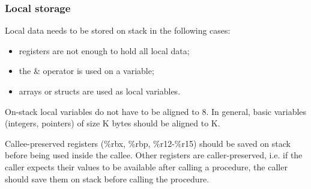 \subsubsection{Local storage}
Local data needs to be stored on stack in the following cases: 
\begin{itemize}
\item registers are not enough to hold all local data;
\item the \& operator is used on a variable;
\item arrays or structs are used as local variables.
\end{itemize}
On-stack local variables do not have to be aligned to 8. In general, basic variables (integers, pointers) of size K bytes should be aligned to K.

Callee-preserved registers (\%rbx, \%rbp, \%r12-\%r15) should be saved on stack before being used inside the callee. Other registers are caller-preserved, i.e. if the caller expects their values to be available after calling a procedure, the caller should save them on stack before calling the procedure. 
